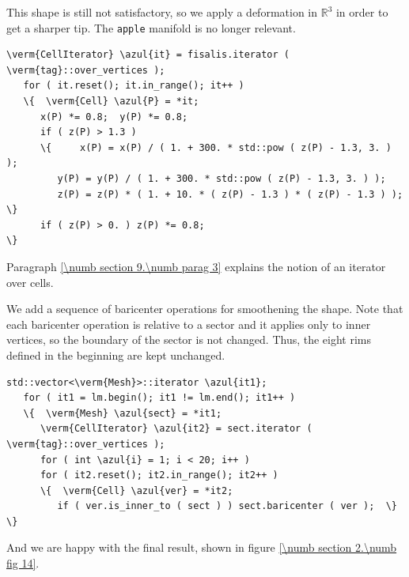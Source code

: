 This shape is still not satisfactory, so we apply a deformation in $ \mathbb{R}^3 $ in order to
get a sharper tip.
The {\small\tt apple} manifold is no longer relevant.

\begin{Verbatim}[commandchars=\\\{\},formatcom=\small\tt,frame=single,
   label=parag-\ref{\numb section 2.\numb parag 11}.cpp,rulecolor=\color{coment},
   baselinestretch=0.94,framesep=2mm]
   \verm{CellIterator} \azul{it} = fisalis.iterator ( \verm{tag}::over_vertices );
   for ( it.reset(); it.in_range(); it++ )
   \{  \verm{Cell} \azul{P} = *it;
      x(P) *= 0.8;  y(P) *= 0.8;
      if ( z(P) > 1.3 )
      \{	 x(P) = x(P) / ( 1. + 300. * std::pow ( z(P) - 1.3, 3. ) );
         y(P) = y(P) / ( 1. + 300. * std::pow ( z(P) - 1.3, 3. ) );
         z(P) = z(P) * ( 1. + 10. * ( z(P) - 1.3 ) * ( z(P) - 1.3 ) );  \}
      if ( z(P) > 0. ) z(P) *= 0.8;                                        \}
\end{Verbatim}

Paragraph \ref{\numb section 9.\numb parag 3} explains the notion of an iterator over cells.

We add a sequence of baricenter operations for smoothening the shape.
Note that each baricenter operation is relative to a sector and it applies only to inner
vertices, so the boundary of the sector is not changed.
Thus, the eight rims defined in the beginning are kept unchanged.

\begin{Verbatim}[commandchars=\\\{\},formatcom=\small\tt,frame=single,
   label=parag-\ref{\numb section 2.\numb parag 11}.cpp,rulecolor=\color{coment},
   baselinestretch=0.94,framesep=2mm]
   std::vector<\verm{Mesh}>::iterator \azul{it1};
   for ( it1 = lm.begin(); it1 != lm.end(); it1++ )
   \{  \verm{Mesh} \azul{sect} = *it1;
      \verm{CellIterator} \azul{it2} = sect.iterator ( \verm{tag}::over_vertices );
      for ( int \azul{i} = 1; i < 20; i++ )
      for ( it2.reset(); it2.in_range(); it2++ )
      \{  \verm{Cell} \azul{ver} = *it2;
         if ( ver.is_inner_to ( sect ) ) sect.baricenter ( ver );  \}                     \}
\end{Verbatim}

And we are happy with the final result, shown in figure \ref{\numb section 2.\numb fig 14}.

